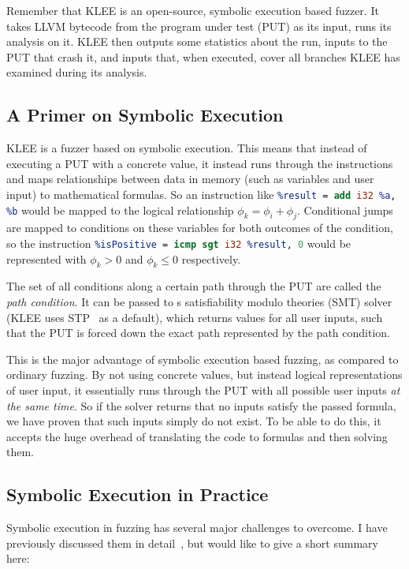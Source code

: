 \documentclass{article}
\let\savedCite=\cite
\renewcommand{\cite}{\unskip~\savedCite}
\begin{document}
Remember that KLEE is an open-source, symbolic execution based fuzzer. It takes LLVM bytecode from the program under test (PUT) as its input, runs its analysis on it. KLEE then outputs some statistics about the run, inputs to the PUT that crash it, and inputs that, when executed, cover all branches KLEE has examined during its analysis.

\subsection{A Primer on Symbolic Execution}
KLEE is a fuzzer based on symbolic execution. This means that instead of executing a PUT with a concrete value, it instead runs through the instructions and maps relationships between data in memory (such as variables and user input) to mathematical formulas. So an instruction like \lstinline[language=llvm]{%result = add i32 %a, %b} would be mapped to the logical relationship $\phi_k=\phi_i+\phi_j$. Conditional jumps are mapped to conditions on these variables for both outcomes of the condition, so the instruction \lstinline[language=llvm]{%isPositive = icmp sgt i32 %result, 0} would be represented with $\phi_k>0$ and $\phi_k\le0$ respectively.

The set of all conditions along a certain path through the PUT are called the \textit{path condition}. It can be passed to s satisfiability modulo theories (SMT) solver (KLEE uses STP\cite{STP} as a default), which returns values for all user inputs, such that the PUT is forced down the exact path represented by the path condition.

This is the major advantage of symbolic execution based fuzzing, as compared to ordinary fuzzing. By not using concrete values, but instead logical representations of user input, it essentially runs through the PUT with all possible user inputs \textit{at the same time}. So if the solver returns that no inputs satisfy the passed formula, we have proven that such inputs simply do not exist. To be able to do this, it accepts the huge overhead of translating the code to formulas and then solving them.

\subsection{Symbolic Execution in Practice}
\label{SymbexPractice}
Symbolic execution in fuzzing has several major challenges to overcome. I have previously discussed them in detail\cite{EVA}, but would like to give a short summary here:
\end{document}
